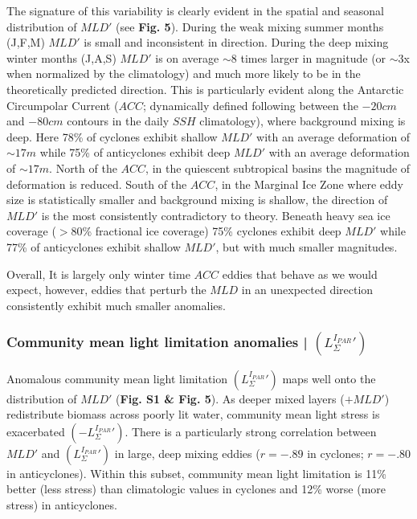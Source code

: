 \documentclass{article}
\begin{document}
The signature of this variability is clearly evident in the spatial and seasonal distribution of $MLD'$ (see \textbf{Fig. 5}). During the weak mixing summer months (J,F,M) $MLD'$ is small and inconsistent in direction. During the deep mixing winter months (J,A,S) $MLD'$ is on average $\sim8$ times larger in magnitude (or $\sim3$x when normalized by the climatology) and much more likely to be in the theoretically predicted direction. This is particularly evident along the Antarctic Circumpolar Current ($ACC$; dynamically defined following \parencite{FrengerImprintSouthernOcean2018} between the $-20cm$ and $-80cm$ contours in the daily $SSH$ climatology), where background mixing is deep. Here 78\% of cyclones exhibit shallow $MLD'$ with an average deformation of $\sim17m$ while 75\% of anticyclones exhibit deep $MLD'$ with an average deformation of $\sim17m$. North of the $ACC$, in the quiescent subtropical basins the magnitude of deformation is reduced. South of the $ACC$, in the Marginal Ice Zone where eddy size is statistically smaller and background mixing is shallow, the direction of $MLD'$ is the most consistently contradictory to theory. Beneath heavy sea ice coverage ($>80$\% fractional ice coverage) 75\% cyclones exhibit deep $MLD'$ while 77\% of anticyclones exhibit shallow $MLD'$, but with much smaller magnitudes. 

Overall, It is largely only winter time $ACC$ eddies that behave as we would expect, however, eddies that perturb the $MLD$ in an unexpected direction consistently exhibit much smaller anomalies.  


\subsubsection{Community mean light limitation anomalies | $(L_\Sigma^{I_{PAR}}')$}

Anomalous community mean light limitation $(L_\Sigma^{I_{PAR}}')$ maps well onto the distribution of $MLD'$ (\textbf{Fig. S1 & Fig. 5}). As deeper mixed layers ($+MLD'$) redistribute biomass across poorly lit water, community mean light stress is exacerbated $(-L_\Sigma^{I_{PAR}}')$. There is a particularly strong correlation between $MLD'$ and $(L_\Sigma^{I_{PAR}}')$ in large, deep mixing eddies ($r=-.89$ in cyclones; $r=-.80$ in anticyclones). Within this subset, community mean light limitation is 11\% better (less stress) than climatologic values in cyclones and 12\% worse (more stress) in anticyclones.  
\end{document}
